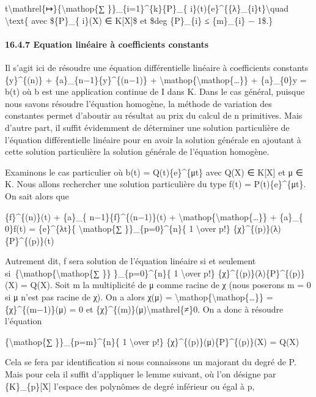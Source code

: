 \documentclass[]{article}
\begin{document}
t\textbackslash{}mathrel\{↦\}\{\textbackslash{}mathop\{∑
\}\}\_\{i=1\}\^{}\{k\}\{P\}\_\{
i\}(t)\{e\}\^{}\{\{λ\}\_\{i\}t\}\textbackslash{}quad
\textbackslash{}text\{ avec \$\{P\}\_\{ i\}(X) ∈ K{[}X{]}\$ et \$deg
\{P\}\_\{i\} ≤ \{m\}\_\{i\} − 1\$.\}

\paragraph{16.4.7 Equation linéaire à coefficients constants}

Il s'agit ici de résoudre une équation différentielle linéaire à
coefficients constants \{y\}\^{}\{(n)\} +
\{a\}\_\{n−1\}\{y\}\^{}\{(n−1)\} +
\textbackslash{}mathop\{\textbackslash{}mathop\{\ldots{}\}\} +
\{a\}\_\{0\}y = b(t) où b est une application continue de I dans K. Dans
le cas général, puisque nous savons résoudre l'équation homogène, la
méthode de variation des constantes permet d'aboutir au résultat au prix
du calcul de n primitives. Mais d'autre part, il suffit évidemment de
déterminer une solution particulière de l'équation différentielle
linéaire pour en avoir la solution générale en ajoutant à cette solution
particulière la solution générale de l'équation homogène.

Examinons le cas particulier où b(t) = Q(t)\{e\}\^{}\{μt\} avec Q(X) ∈
K{[}X{]} et μ ∈ K. Nous allons rechercher une solution particulière du
type f(t) = P(t)\{e\}\^{}\{μt\}. On sait alors que

\{f\}\^{}\{(n)\}(t) + \{a\}\_\{ n−1\}\{f\}\^{}\{(n−1)\}(t) +
\textbackslash{}mathop\{\textbackslash{}mathop\{\ldots{}\}\} + \{a\}\_\{
0\}f(t) = \{e\}\^{}\{λt\}\{ \textbackslash{}mathop\{∑
\}\}\_\{p=0\}\^{}\{n\}\{ 1 \textbackslash{}over p!\}
\{χ\}\^{}\{(p)\}(λ)\{P\}\^{}\{(p)\}(t)

Autrement dit, f sera solution de l'équation linéaire si et seulement
si~\{\textbackslash{}mathop\{\textbackslash{}mathop\{∑ \}\}
\}\_\{p=0\}\^{}\{n\}\{ 1 \textbackslash{}over p!\}
\{χ\}\^{}\{(p)\}(λ)\{P\}\^{}\{(p)\}(X) = Q(X). Soit m la multiplicité de
μ comme racine de χ (nous poserons m = 0 si μ n'est pas racine de χ). On
a alors χ(μ) =
\textbackslash{}mathop\{\textbackslash{}mathop\{\ldots{}\}\} =
\{χ\}\^{}\{(m−1)\}(μ) = 0 et
\{χ\}\^{}\{(m)\}(μ)\textbackslash{}mathrel\{≠\}0. On a donc à résoudre
l'équation

\{\textbackslash{}mathop\{∑ \}\}\_\{p=m\}\^{}\{n\}\{ 1
\textbackslash{}over p!\} \{χ\}\^{}\{(p)\}(μ)\{P\}\^{}\{(p)\}(X) = Q(X)

Cela se fera par identification si nous connaissons un majorant du degré
de P. Mais pour cela il suffit d'appliquer le lemme suivant, où l'on
désigne par \{K\}\_\{p\}{[}X{]} l'espace des polynômes de degré
inférieur ou égal à p,
\end{document}
